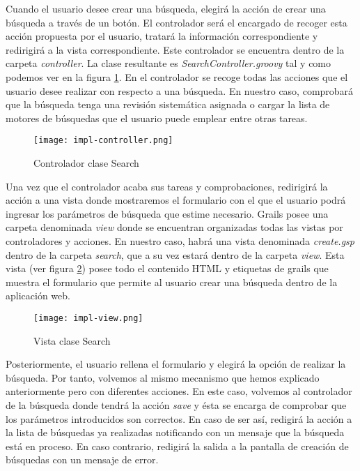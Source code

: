 Cuando el usuario desee crear una búsqueda, elegirá la acción de crear una búsqueda a través de un botón. El controlador será el encargado de recoger esta acción propuesta por el usuario, tratará la información correspondiente y redirigirá a la vista correspondiente. Este controlador se encuentra dentro de la carpeta \textit{controller}. La clase resultante es \textit{SearchController.groovy} tal y como podemos ver en la figura \ref{fig:impl-controller}. En el controlador se recoge todas las acciones que el usuario desee realizar con respecto a una búsqueda. En nuestro caso, comprobará que la búsqueda tenga una revisión sistemática asignada o cargar la lista de motores de búsquedas que el usuario puede emplear entre otras tareas.\\

\begin{figure}[!hpt]
	\begin{center} 
		\texttt{[image: impl-controller.png]}
		\caption{Controlador clase Search}
		\label{fig:impl-controller}
	\end{center}
\end{figure}

Una vez que el controlador acaba sus tareas y comprobaciones, redirigirá la acción a una vista donde mostraremos el formulario con el que el usuario podrá ingresar los parámetros de búsqueda que estime necesario. Grails posee una carpeta denominada \textit{view} donde se encuentran organizadas todas las vistas por controladores y acciones. En nuestro caso, habrá una vista denominada \textit{create.gsp} dentro de la carpeta \textit{search}, que a su vez estará dentro de la carpeta \textit{view}. Esta vista (ver figura \ref{fig:impl-view}) posee todo el contenido HTML y etiquetas de grails que muestra el formulario que permite al usuario crear una búsqueda dentro de la aplicación web.\\

\begin{figure}[!hpt]
	\begin{center} 
		\texttt{[image: impl-view.png]}
		\caption{Vista clase Search}
		\label{fig:impl-view}
	\end{center}
\end{figure}

Posteriormente, el usuario rellena el formulario y elegirá la opción de realizar la búsqueda. Por tanto, volvemos al mismo mecanismo que hemos explicado anteriormente pero con diferentes acciones. En este caso, volvemos al controlador de la búsqueda donde tendrá la acción \textit{save} y ésta se encarga de comprobar que los parámetros introducidos son correctos. En caso de ser así, redigirá la acción a la lista de búsquedas ya realizadas notificando con un mensaje que la búsqueda está en proceso. En caso contrario, redigirá la salida a la pantalla de creación de búsquedas con un mensaje de error.\\

